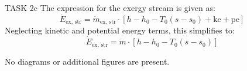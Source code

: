 TASK 2c  
The expression for the exergy stream is given as:  
\[
\dot{E}_{\text{ex, str}} = \dot{m}_{\text{ex, str}} \cdot \left[ h - h_0 - T_0 (s - s_0) + \text{ke} + \text{pe} \right]
\]  
Neglecting kinetic and potential energy terms, this simplifies to:  
\[
\dot{E}_{\text{ex, str}} = \dot{m} \cdot \left[ h - h_0 - T_0 (s - s_0) \right]
\]  

No diagrams or additional figures are present.